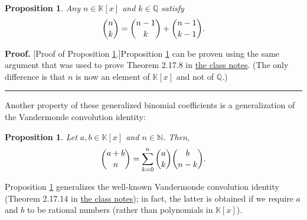 \documentclass[paper=a4, fontsize=12pt]{scrartcl}%
\let\sumnonlimits\sum
\renewcommand{\sum}{\sumnonlimits\limits}
\theoremstyle{plainsl}
\newtheorem{proposition}[theorem]{Proposition}
\theoremstyle{definition}
\theoremstyle{remark}
\newenvironment{proof}[1][Proof]{\noindent\textbf{#1.} }{\ \rule{0.5em}{0.5em}}
\begin{document}
\begin{proposition}
\label{prop.pol.general-binom.rec}Any $n\in\mathbb{K}\left[  x\right]  $ and
$k\in\mathbb{Q}$ satisfy
\[
\dbinom{n}{k}=\dbinom{n-1}{k}+\dbinom{n-1}{k-1}.
\]

\end{proposition}

\begin{proof}
[Proof of Proposition \ref{prop.pol.general-binom.rec}.]Proposition
\ref{prop.pol.general-binom.rec} can be proven using the same argument that
was used to prove Theorem 2.17.8 in
\href{http://www.cip.ifi.lmu.de/~grinberg/t/19s/notes.pdf}{the class notes}.
(The only difference is that $n$ is now an element of $\mathbb{K}\left[
x\right]  $ and not of $\mathbb{Q}$.)
\end{proof}

Another property of these generalized binomial coefficients is a
generalization of the Vandermonde convolution identity:

\begin{proposition}
\label{prop.pol.general-binom.vander}Let $a,b\in\mathbb{K}
\left[  x\right]  $ and $n\in\mathbb{N}$. Then,%
\[
\dbinom{a+b}{n}=\sum_{k=0}^{n}\dbinom{a}{k}\dbinom{b}{n-k}.
\]

\end{proposition}

Proposition \ref{prop.pol.general-binom.vander} generalizes the well-known
Vandermonde convolution identity (Theorem 2.17.14 in
\href{http://www.cip.ifi.lmu.de/~grinberg/t/19s/notes.pdf}{the class notes});
in fact, the latter is obtained if we require $a$ and $b$ to be rational
numbers (rather than polynomials in $\mathbb{K}\left[  x\right]  $).
\end{document}

